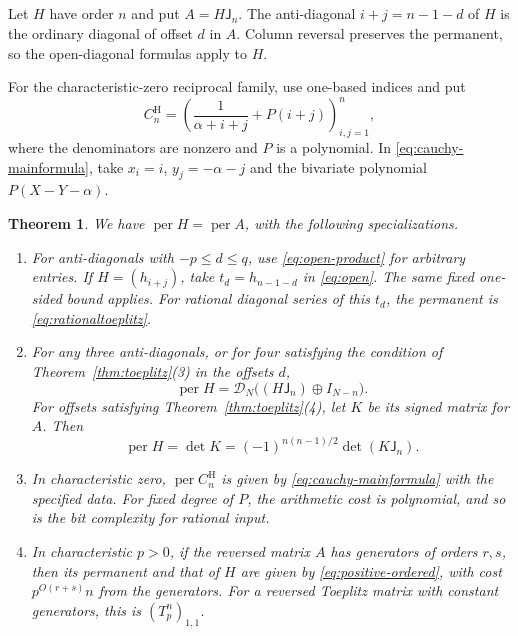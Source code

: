 \documentclass[11pt,reqno]{amsart}
\newtheorem{theorem}{Theorem}[section]
\theoremstyle{remark}
\numberwithin{equation}{section}
\newcommand{\per}{\operatorname{per}}
\begin{document}
\subsection{}

Let \(H\) have order \(n\) and put \(A=H\mathsf J_n\).
The anti-diagonal \(i+j=n-1-d\) of \(H\) is the ordinary
diagonal of offset \(d\) in \(A\). Column reversal preserves
the permanent, so the open-diagonal formulas apply to \(H\).

For the characteristic-zero reciprocal family, use one-based
indices and put
\[
 C_n^{\mathrm H}=\left(\frac1{\alpha+i+j}+P(i+j)\right)_{i,j=1}^n,
\]
where the denominators are nonzero and \(P\) is a polynomial.
In \eqref{eq:cauchy-mainformula}, take \(x_i=i\),
\(y_j=-\alpha-j\) and the bivariate polynomial
\(P(X-Y-\alpha)\).

\begin{theorem}\label{thm:hankel}
We have \(\per H=\per A\), with the following specializations.
\begin{enumerate}
\item For anti-diagonals with \(-p\le d\le q\), use
\eqref{eq:open-product} for arbitrary entries. If \(H=(h_{i+j})\),
take \(t_d=h_{n-1-d}\) in \eqref{eq:open}. The same fixed one-sided
bound applies. For rational diagonal series of this \(t_d\),
the permanent is \eqref{eq:rationaltoeplitz}.
\item For any three anti-diagonals, or for four satisfying the
condition of Theorem~\ref{thm:toeplitz}(3) in the offsets \(d\),
\[
 \per H=\mathcal D_N\bigl((H\mathsf J_n)\oplus I_{N-n}\bigr).
\]
For offsets satisfying Theorem~\ref{thm:toeplitz}(4), let \(K\)
be its signed matrix for \(A\). Then
\[
 \per H=\det K=(-1)^{n(n-1)/2}\det(K\mathsf J_n).
\]

\item In characteristic zero, \(\per C_n^{\mathrm H}\) is given
by \eqref{eq:cauchy-mainformula} with the specified data. For
fixed degree of \(P\), the arithmetic cost is polynomial, and
so is the bit complexity for rational input.

\item In characteristic \(p>0\), if the reversed matrix \(A\)
has generators of orders \(r,s\), then its permanent and that
of \(H\) are given by \eqref{eq:positive-ordered}, with cost
\(p^{O(r+s)}n\) from the generators. For a reversed Toeplitz
matrix with constant generators, this is \((T_p^n)_{1,1}\).
\end{enumerate}
\end{theorem}
\end{document}
